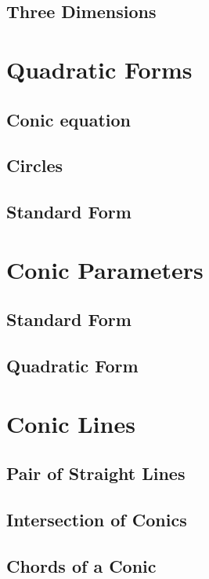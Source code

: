 \documentclass[11pt]{book}
\begin{document}
\section{Three Dimensions}

\chapter{Quadratic Forms}
\section{Conic equation }

\section{Circles}


\section{Standard Form}

\chapter{Conic Parameters}
\section{Standard Form}

\section{Quadratic Form }


\chapter{Conic Lines}
\section{Pair of Straight Lines}
%

\section{Intersection of Conics}

\section{ Chords of a Conic}

\end{document}
